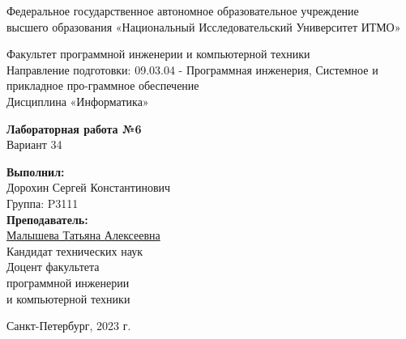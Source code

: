 

% 
\begin{center}
    Федеральное государственное автономное образовательное учреждение\\
    высшего образования «Национальный Исследовательский Университет ИТМО»
    \vspace{2cm}

    Факультет программной инженерии и компьютерной техники\\
    Направление подготовки: 09.03.04 - Программная инженерия, Системное и прикладное про-граммное обеспечение\\
    Дисциплина «Информатика»\\

    
    \vspace{6cm}

    \Large
    \textbf{Лабораторная работа №6} \\
    Вариант 34
\end{center}

\vspace{6cm}

\hfill\begin{minipage}{0.35\linewidth}
\textbf{Выполнил:}\\
Дорохин Сергей Константинович\\
Группа: P3111\\

\textbf{Преподаватель:} \\
\underline{Малышева Татьяна Алексеевна}\\
Кандидат технических наук\\
Доцент факультета \\
программной инженерии \\
и компьютерной техники\\

\end{minipage}

\vfill

\begin{center}
    Санкт-Петербург, 2023 г.
\end{center}

\newpage
% 